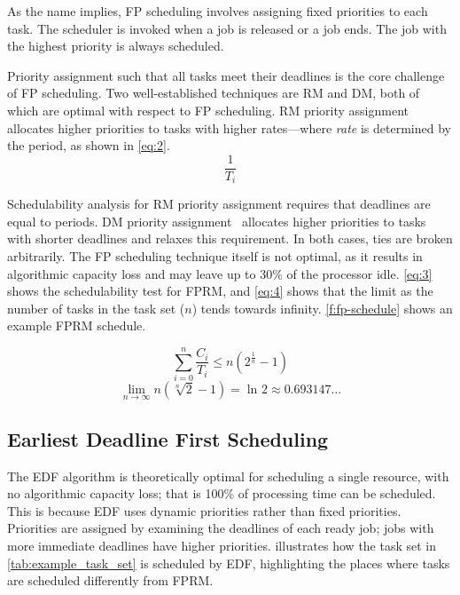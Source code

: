 As the name implies, \gls{FP} scheduling involves assigning fixed priorities to each task.
The scheduler is invoked when a job is released or a job ends.
The job with the highest priority is always scheduled.

Priority assignment such that all tasks meet their deadlines is the core challenge of \gls{FP} scheduling.
Two well-established techniques are \gls{RM} and \gls{DM}, both of which are optimal with respect to \gls{FP} scheduling.
\Gls{RM} priority assignment~\citep{Liu_Layland_73} allocates higher priorities to tasks with higher
rates---where \emph{rate} is determined by the period, as shown in \cref{eq:2}.
\begin{equation}
    \label{eq:2}
	\dfrac{1}{T_{i}}
\end{equation}

Schedulability analysis for \gls{RM} priority assignment requires that deadlines are equal to periods.
\Gls{DM} priority assignment~\citep{Leung_Whitehead_82} allocates higher priorities to tasks with shorter deadlines and relaxes this requirement.
In both cases, ties are broken arbitrarily.
The \gls{FP} scheduling technique itself is not optimal, as it results in algorithmic capacity loss
and may leave up to 30\% of the processor idle. \cref{eq:3} shows the schedulability test for
\gls{FPRM}, and \cref{eq:4} shows that the limit as the number of tasks in the task set ($n$) tends
towards infinity.
\cref{f:fp-schedule} shows an example \gls{FPRM} schedule.

\begin{equation}
    \label{eq:3}
    \sum\limits_{i=0}^n \dfrac{C_{i}}{T_{i}} \leq n(2^{\frac{1}{n}}-1)
\end{equation}
\begin{equation}
    \label{eq:4}
    \lim_{n \to \infty}n(\sqrt[n]{2}-1) = \ln_{} 2 \approx 0.693147\ldots
\end{equation}

\subsection{Earliest Deadline First Scheduling}
\label{sec:background-edf}

The \gls{EDF} algorithm is theoretically optimal for scheduling a single resource, with no
algorithmic capacity loss; that is 100\% of processing time can be scheduled. This is because
\gls{EDF} uses dynamic priorities rather than fixed priorities. 
Priorities are assigned by examining the deadlines of each ready job; jobs with more immediate deadlines have higher priorities.
 illustrates how the task set in \cref{tab:example_task_set} is scheduled by
\gls{EDF}, highlighting the places where tasks are scheduled differently from FPRM.

